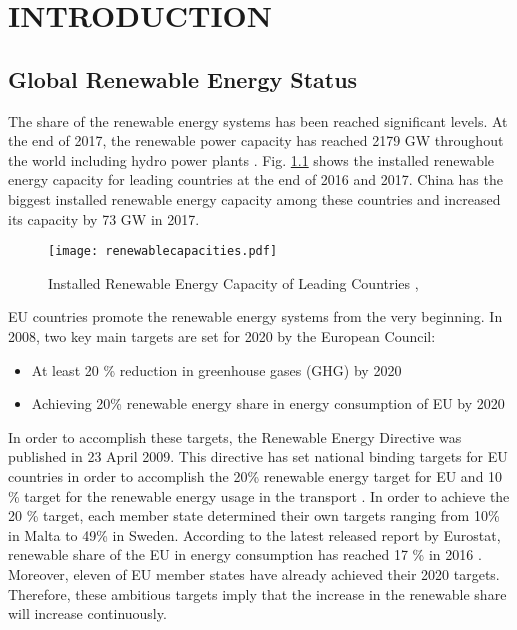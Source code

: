 \chapter{INTRODUCTION}
\label{chp:1}
\section{Global Renewable Energy Status}
The share of the renewable energy systems has been reached significant levels. At the end of 2017, the renewable power capacity has reached 2179 GW throughout the world including hydro power plants \cite{InternationalRenewableEnergyAgencyIRENA2018}. Fig. \ref{renewablecap} shows the installed renewable energy capacity for leading countries at the end of 2016 and 2017. China has the biggest installed renewable energy capacity among these countries and increased its capacity by 73 GW in 2017.\par
\begin{figure}[h]
	\centering
	\texttt{[image: renewablecapacities.pdf]}
	\caption{Installed Renewable Energy Capacity of Leading Countries \cite{InternationalRenewableEnergyAgencyIRENA2018},\cite{InternationalRenewableEnergyAgency2017}}
	\label{renewablecap}
\end{figure}
EU countries promote the renewable energy systems from the very beginning. In 2008, two key main targets are set for 2020 by the European Council\cite{EuropeanCommission2008}: 
\begin{itemize}  
	\item At least 20 \% reduction in greenhouse gases (GHG) by 2020
	\item Achieving 20\% renewable energy share in energy consumption of EU by 2020
\end{itemize}
In order to accomplish these targets, the Renewable Energy Directive was published in 23 April 2009. This directive has set national binding targets for EU countries in order to accomplish the 20\% renewable energy target for EU and 10 \% target for the renewable energy usage in the transport \cite{EuropeanParliament2009}. In order to achieve the 20 \% target, each member state determined their own targets ranging from 10\% in Malta to 49\% in Sweden. According to the latest released report by Eurostat, renewable share of the EU in energy consumption has reached 17 \% in 2016 \cite{States2016}. Moreover, eleven of EU member states have already achieved their 2020 targets. Therefore, these ambitious targets imply that the increase in the renewable share will increase continuously.\par

